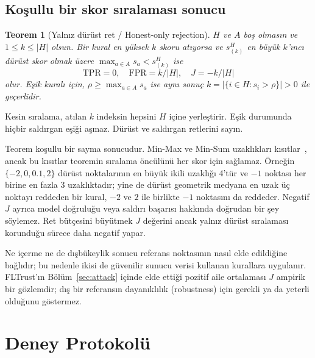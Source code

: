 \documentclass[journal]{IEEEtran}
\newtheorem{theorem}{Teorem}
\begin{document}
\subsection{Koşullu bir skor sıralaması sonucu}
\begin{theorem}[Yalnız dürüst ret / Honest-only rejection]\label{thm:inversion}
$H$ ve $A$ boş olmasın ve $1\leq k\leq|H|$ olsun. Bir kural en yüksek $k$ skoru atıyorsa ve $s^H_{(k)}$ en büyük $k$'ıncı dürüst skor olmak üzere $\max_{a\in A}s_a<s^H_{(k)}$ ise
\[
\mathrm{TPR}=0,\quad\mathrm{FPR}=k/|H|,\quad J=-k/|H|
\]
olur. Eşik kuralı için, $\rho\geq\max_{a\in A}s_a$ ise aynı sonuç $k=|\{i\in H:s_i>\rho\}|>0$ ile geçerlidir.
\end{theorem}
\begin{IEEEproof}
Kesin sıralama, atılan $k$ indeksin hepsini $H$ içine yerleştirir. Eşik durumunda hiçbir saldırgan eşiği aşmaz. Dürüst ve saldırgan retlerini sayın.
\end{IEEEproof}
Teorem koşullu bir sayma sonucudur. Min-Max ve Min-Sum uzaklıkları kısıtlar~\cite{shejwalkar2021}, ancak bu kısıtlar teoremin sıralama öncülünü her skor için sağlamaz. Örneğin $\{-2,0,0.1,2\}$ dürüst noktalarının en büyük ikili uzaklığı 4'tür ve $-1$ noktası her birine en fazla 3 uzaklıktadır; yine de dürüst geometrik medyana en uzak üç noktayı reddeden bir kural, $-2$ ve $2$ ile birlikte $-1$ noktasını da reddeder. Negatif $J$ ayrıca model doğruluğu veya saldırı başarısı hakkında doğrudan bir şey söylemez. Ret bütçesini büyütmek $J$ değerini ancak yalnız dürüst sıralaması korunduğu sürece daha negatif yapar.

Ne içerme ne de dışbükeylik sonucu referans noktasının nasıl elde edildiğine bağlıdır; bu nedenle ikisi de güvenilir sunucu verisi kullanan kurallara uygulanır. FLTrust'ın Bölüm~\ref{sec:attack} içinde elde ettiği pozitif aile ortalaması $J$ ampirik bir gözlemdir; dış bir referansın dayanıklılık (robustness) için gerekli ya da yeterli olduğunu göstermez.

\section{Deney Protokolü}\label{sec:protocol}

\end{document}
